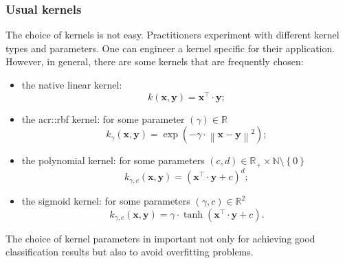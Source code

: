         \subsubsection{Usual kernels}
            The choice of kernels is not easy.
            Practitioners experiment with different kernel types and parameters.
            One can engineer a kernel specific for their application.
            However, in general, there are some kernels that are frequently chosen:
            \begin{itemize}
                \item the native linear kernel:
                \begin{equation}
                    \label{eq::linear_kernel}
                    k(\bm{x}, \bm{y}) = \bm{x}^\intercal \cdot \bm{y};
                \end{equation}
                \item the \gls{acr::rbf} kernel: for some parameter $(\gamma) \in \mathbb{R}$
                \begin{equation}
                    \label{eq::rbf_kernel}
                    k_{\gamma}(\bm{x}, \bm{y}) = \exp\left(-\gamma \cdot \left\lVert \bm{x} - \bm{y} \right\rVert^2\right);
                \end{equation}
                \item the polynomial kernel: for some parameters $(c, d) \in \mathbb{R}_+ \times \mathbb{N} \setminus \left\{0\right\} $
                \begin{equation}
                    \label{eq::polynomial_kernel}
                    k_{\gamma, c}(\bm{x}, \bm{y}) = (\bm{x}^\intercal \cdot \bm{y} + c)^d;
                \end{equation}
                \item the sigmoid kernel: for some parameters $(\gamma, c) \in \mathbb{R}^2$
                \begin{equation}
                    \label{eq::sigmoid_kernel}
                    k_{\gamma, c}(\bm{x}, \bm{y}) = \gamma \cdot \tanh(\bm{x}^\intercal \cdot \bm{y} + c).
                \end{equation}
            \end{itemize}
            The choice of kernel parameters in important not only for achieving good classification results but also to avoid overfitting problems.

